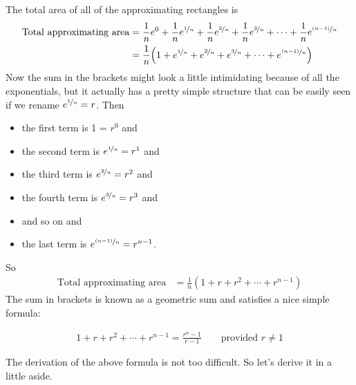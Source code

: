 \begin{eg}
The total area of all of the approximating rectangles is
\begin{align*}
\text{Total approximating area} &= \frac{1}{n}e^0
                                   + \frac{1}{n}e^{\nicefrac{1}{n}}
                                   + \frac{1}{n}e^{\nicefrac{2}{n}}
                                   + \frac{1}{n}e^{\nicefrac{3}{n}}
                                   + \cdots
                                   + \frac{1}{n}e^{\nicefrac{(n-1)}{n}} \\
&= \frac{1}{n}\Big( 1+ e^{\nicefrac{1}{n}}
+e^{\nicefrac{2}{n}}+e^{\nicefrac{3}{n}} +\cdots+
          e^{\nicefrac{(n-1)}{n}}\Big)
\end{align*}
Now the sum in the brackets might look a little intimidating because of all the
exponentials, but it actually has a pretty simple structure that can be easily
seen if we rename $e^{\nicefrac{1}{n}}=r$. Then
\begin{itemize}
\item the first term is 1 = $r^0$ and
\item the second term is $e^{\nicefrac{1}{n}}=r^1$ and
\item the third term is $e^{\nicefrac{2}{n}}=r^2$ and
\item the fourth term is $e^{\nicefrac{3}{n}}=r^3$ and
\item and so on and
\item the last term is $e^{\nicefrac{(n-1)}{n}}=r^{n-1}$.
\end{itemize}
So
\begin{align*}
\text{Total approximating area}
&= \frac{1}{n}\left( 1+ r +r^2 +\cdots+ r^{n-1}\right)
\end{align*}
The sum in brackets is known as a geometric sum and satisfies a nice simple
formula:
\begin{impeqn}\label{eq:INTgeomsum}
 \begin{align*}
1+ r +r^2 +\cdots+ r^{n-1} =\frac{r^n-1}{r-1} \qquad\text{provided $r\ne 1$}
\end{align*}
\end{impeqn}


\noindent The derivation of the above formula is not too difficult. So let's
derive it in a little aside.

\end{eg}
